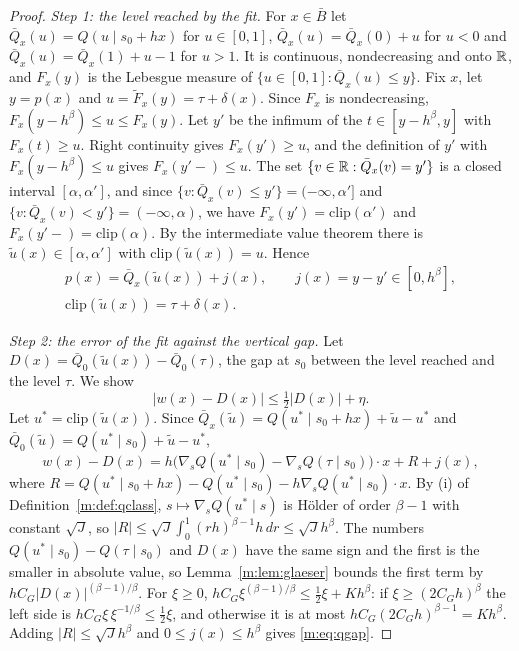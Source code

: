 \begin{proof}
\emph{Step 1: the level reached by the fit.} For $x\in\bar B$ let $\bar Q_x(u)=Q(u\mid s_0+hx)$ for $u\in[0,1]$, $\bar Q_x(u)=\bar Q_x(0)+u$ for $u<0$ and $\bar Q_x(u)=\bar Q_x(1)+u-1$ for $u>1$. It is continuous, nondecreasing and onto $\mathbb{R}$, and $F_x(y)$ is the Lebesgue measure of $\{u\in[0,1]:\bar Q_x(u)\le y\}$. Fix $x$, let $y=p(x)$ and $u=\tilde F_x(y)=\tau+\delta(x)$. Since $F_x$ is nondecreasing, $F_x(y-h^\beta)\le u\le F_x(y)$. Let $y'$ be the infimum of the $t\in[y-h^\beta,y]$ with $F_x(t)\ge u$. Right continuity gives $F_x(y')\ge u$, and the definition of $y'$ with $F_x(y-h^\beta)\le u$ gives $F_x(y'-)\le u$. The set $\{v\in\mathbb{R}:\bar Q_x(v)=y'\}$ is a closed interval $[\alpha,\alpha']$, and since $\{v:\bar Q_x(v)\le y'\}=(-\infty,\alpha']$ and $\{v:\bar Q_x(v)<y'\}=(-\infty,\alpha)$, we have $F_x(y')=\mathrm{clip}(\alpha')$ and $F_x(y'-)=\mathrm{clip}(\alpha)$. By the intermediate value theorem there is $\tilde u(x)\in[\alpha,\alpha']$ with $\mathrm{clip}(\tilde u(x))=u$. Hence
\[
\begin{gathered}
p(x)=\bar Q_x(\tilde u(x))+j(x),\qquad j(x)=y-y'\in[0,h^\beta],\\
\mathrm{clip}(\tilde u(x))=\tau+\delta(x).
\end{gathered}
\]

\emph{Step 2: the error of the fit against the vertical gap.} Let $D(x)=\bar Q_0(\tilde u(x))-\bar Q_0(\tau)$, the gap at $s_0$ between the level reached and the level $\tau$. We show
\begin{equation}\label{m:eq:qgap}
|w(x)-D(x)|\le\tfrac12|D(x)|+\eta .
\end{equation}
Let $u^*=\mathrm{clip}(\tilde u(x))$. Since $\bar Q_x(\tilde u)=Q(u^*\mid s_0+hx)+\tilde u-u^*$ and $\bar Q_0(\tilde u)=Q(u^*\mid s_0)+\tilde u-u^*$,
\[
w(x)-D(x)=h\big(\nabla_sQ(u^*\mid s_0)-\nabla_sQ(\tau\mid s_0)\big)\cdot x+R+j(x),
\]
where $R=Q(u^*\mid s_0+hx)-Q(u^*\mid s_0)-h\nabla_sQ(u^*\mid s_0)\cdot x$. By (i) of Definition~\ref{m:def:qclass}, $s\mapsto\nabla_sQ(u^*\mid s)$ is H\"older of order $\beta-1$ with constant $\sqrt J$, so $|R|\le\sqrt J\int_0^1(rh)^{\beta-1}h\,dr\le\sqrt Jh^\beta$. The numbers $Q(u^*\mid s_0)-Q(\tau\mid s_0)$ and $D(x)$ have the same sign and the first is the smaller in absolute value, so Lemma~\ref{m:lem:glaeser} bounds the first term by $hC_G|D(x)|^{(\beta-1)/\beta}$. For $\xi\ge0$, $hC_G\xi^{(\beta-1)/\beta}\le\frac12\xi+Kh^\beta$: if $\xi\ge(2C_Gh)^\beta$ the left side is $hC_G\xi\,\xi^{-1/\beta}\le\frac12\xi$, and otherwise it is at most $hC_G(2C_Gh)^{\beta-1}=Kh^\beta$. Adding $|R|\le\sqrt Jh^\beta$ and $0\le j(x)\le h^\beta$ gives \eqref{m:eq:qgap}.


\end{proof}
